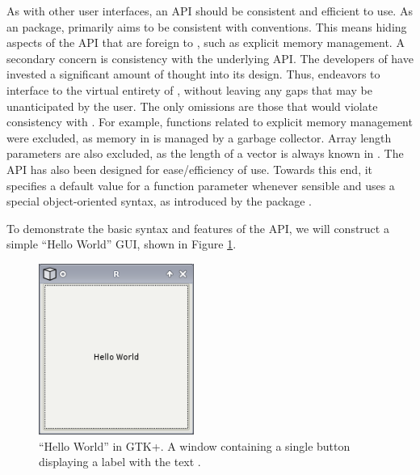 \documentclass[article,shortnames]{jss}
\begin{document}


As with other user interfaces,
an API should be consistent and efficient to use. As an 
package,
 primarily aims to be consistent with 
conventions. This
means hiding aspects of the  API that are foreign to
,
such as explicit memory management. A secondary concern is consistency 
with the underlying  API. The developers of
 have invested a significant amount of thought into its
design. Thus,
 endeavors to interface  to the virtual
entirety of ,
without leaving any gaps that may be unanticipated by the user. 
The only omissions are those that would violate consistency with
. For example, functions related to explicit memory
management were excluded, as memory in  is managed by a
garbage collector. Array length parameters are also excluded, as the
length of a vector is always known in .
The  API has also been designed for ease/efficiency of use.
Towards this end, it specifies a default value for a function
parameter whenever sensible and uses a special object-oriented syntax,
as introduced by the  package \citep{sjava}.

To demonstrate the basic syntax and features of the  API,
we will construct a simple ``Hello World'' GUI, shown in Figure
\ref{fig:hello-world}.

\begin{figure}[h!tbp]
\begin{center}
\includegraphics[width=2in]{hello-world.png}
\caption{\label{fig:hello-world}``Hello World'' in GTK+. 
A window containing a single button displaying a label with the text
.}
\end{center}
\end{figure}
\end{document}
